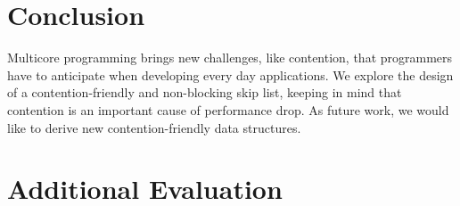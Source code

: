 %



\section{Conclusion}\label{sec:conclusion}

Multicore programming brings new challenges, like contention, that programmers have to anticipate
when developing every day applications.
We explore the design of a contention-friendly and non-blocking skip list, keeping in 
mind that contention
is an important cause of performance drop.
As future work, we would like to derive new contention-friendly data structures.



% 
% 
% 
% 




\section{Additional Evaluation}\label{app:expe}


